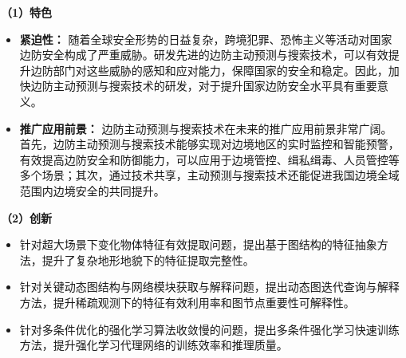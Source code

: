 \textbf{（1）特色}

\begin{itemize}[left=30pt,itemsep=1em,label={\textasteriskcentered}]

\item \textbf{紧迫性：} 随着全球安全形势的日益复杂，跨境犯罪、恐怖主义等活动对国家边防安全构成了严重威胁。研发先进的边防主动预测与搜索技术，可以有效提升边防部门对这些威胁的感知和应对能力，保障国家的安全和稳定。因此，加快边防主动预测与搜索技术的研发，对于提升国家边防安全水平具有重要意义。
\item \textbf{推广应用前景：} 边防主动预测与搜索技术在未来的推广应用前景非常广阔。
首先，边防主动预测与搜索技术能够实现对边境地区的实时监控和智能预警，有效提高边防安全和防御能力，可以应用于边境管控、缉私缉毒、人员管控等多个场景；其次，通过技术共享，主动预测与搜索技术还能促进我国边境全域范围内边境安全的共同提升。

\end{itemize}

\textbf{（2）创新}

\begin{itemize}[left=30pt,itemsep=1em,label={\textasteriskcentered}]

\item 针对超大场景下变化物体特征有效提取问题，提出基于图结构的特征抽象方法，提升了复杂地形地貌下的特征提取完整性。
\item 针对关键动态图结构与网络模块获取与解释问题，提出动态图迭代查询与解释方法，提升稀疏观测下的特征有效利用率和图节点重要性可解释性。
\item 针对多条件优化的强化学习算法收敛慢的问题，提出多条件强化学习快速训练方法，提升强化学习代理网络的训练效率和推理质量。

\end{itemize}